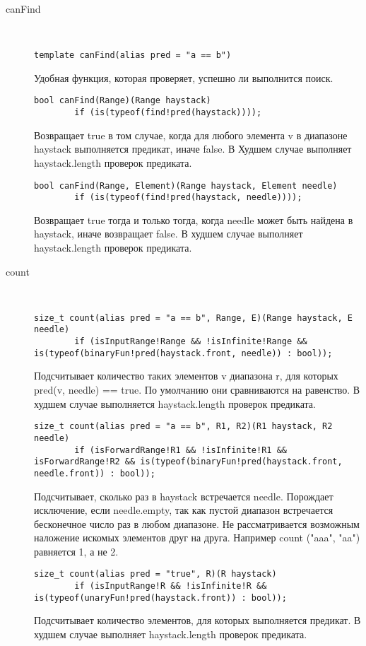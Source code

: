 \documentclass[12pt]{article}
\begin{document}
\begin{description}
\item [canFind] \hfill \\
\begin{verbatim}
template canFind(alias pred = "a == b")
\end{verbatim}
Удобная функция, которая проверяет, успешно ли выполнится поиск.
\begin{verbatim}
bool canFind(Range)(Range haystack) 
        if (is(typeof(find!pred(haystack))));
\end{verbatim}
Возвращает true в том случае, когда для любого элемента v в диапазоне haystack выполняется предикат, иначе false. 
В Худшем случае выполняет haystack.length проверок предиката.
\begin{verbatim}
bool canFind(Range, Element)(Range haystack, Element needle) 
        if (is(typeof(find!pred(haystack, needle))));
\end{verbatim}
Возвращает true тогда и только тогда, когда needle может быть найдена в haystack, иначе возвращает false.
В худшем случае выполняет haystack.length проверок предиката.

\item [count] \hfill \\
\begin{verbatim}
size_t count(alias pred = "a == b", Range, E)(Range haystack, E needle) 
        if (isInputRange!Range && !isInfinite!Range && is(typeof(binaryFun!pred(haystack.front, needle)) : bool)); 
\end{verbatim}
Подсчитывает количество таких элементов v диапазона r, для которых pred(v, needle) == true. По умолчанию они сравниваются на равенство.
В худшем случае выполняется haystack.length проверок предиката.
\begin{verbatim}
size_t count(alias pred = "a == b", R1, R2)(R1 haystack, R2 needle) 
        if (isForwardRange!R1 && !isInfinite!R1 && isForwardRange!R2 && is(typeof(binaryFun!pred(haystack.front, needle.front)) : bool)); 
\end{verbatim}
Подсчитывает, сколько раз в haystack встречается needle. Порождает исключение, если needle.empty, так как пустой диапазон встречается
бесконечное число раз в любом диапазоне. Не рассматривается возможным наложение искомых элементов друг на друга. Например
count ("aaa", "aa") равняется 1, а не 2.
\begin{verbatim}
size_t count(alias pred = "true", R)(R haystack) 
        if (isInputRange!R && !isInfinite!R && is(typeof(unaryFun!pred(haystack.front)) : bool));
\end{verbatim}
Подсчитывает количество элементов, для которых выполняется предикат. В худшем случае выполняет haystack.length проверок предиката.


\end{description}
\end{document}
